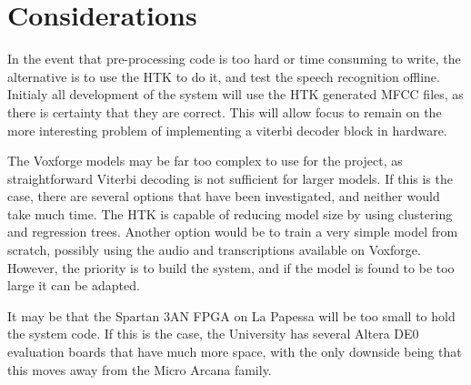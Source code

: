 \section{Considerations} %
\label{sec:details_of_tasks}
In the event that pre-processing code is too hard or time consuming to write, the alternative is to use the HTK to do it, and test the speech recognition offline.  Initialy all development of the system will use the HTK generated MFCC files, as there is certainty that they are correct.  This will allow focus to remain on the more interesting problem of implementing a viterbi decoder block in hardware.

The Voxforge models may be far too complex to use for the project, as straightforward Viterbi decoding is not sufficient for larger models.  If this is the case, there are several options that have been investigated, and neither would take much time.  The HTK is capable of reducing model size by using clustering and regression trees.  Another option would be to train a very simple model from scratch, possibly using the audio and transcriptions available on Voxforge.  However, the priority is to build the system, and if the model is found to be too large it can be adapted.

It may be that the Spartan 3AN FPGA on La Papessa will be too small to hold the system code.  If this is the case, the University has several Altera DE0 evaluation boards that have much more space, with the only downside being that this moves away from the Micro Arcana family.  



